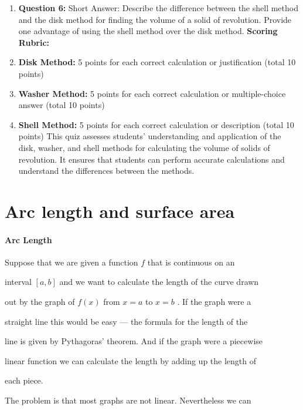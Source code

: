\begin{enumerate}
    \item \textbf{Question 6:} Short Answer: Describe the difference between the shell method and the disk method for finding the volume of a solid of revolution. Provide one advantage of using the shell method over the disk method. \textbf{Scoring Rubric:}
    \item \textbf{Disk Method:} 5 points for each correct calculation or justification (total 10 points)
    \item \textbf{Washer Method:} 5 points for each correct calculation or multiple-choice answer (total 10 points)
    \item \textbf{Shell Method:} 5 points for each correct calculation or description (total 10 points) This quiz assesses students' understanding and application of the disk, washer, and shell methods for calculating the volume of solids of revolution. It ensures that students can perform accurate calculations and understand the differences between the methods.
\end{enumerate}

\section{Arc length and surface area}
\label{sec:arc-length-and-surface-area}

\paragraph{Arc Length}



Suppose that we are given a function $f$ that is continuous on an

interval $[a,b]$ and we want to calculate the length of the curve drawn

out by the graph of $f(x)$ from $x=a$ to $x=b$ . If the graph were a

straight line this would be easy --- the formula for the length of the

line is given by Pythagoras' theorem. And if the graph were a piecewise

linear function we can calculate the length by adding up the length of

each piece.



The problem is that most graphs are not linear. Nevertheless we can

